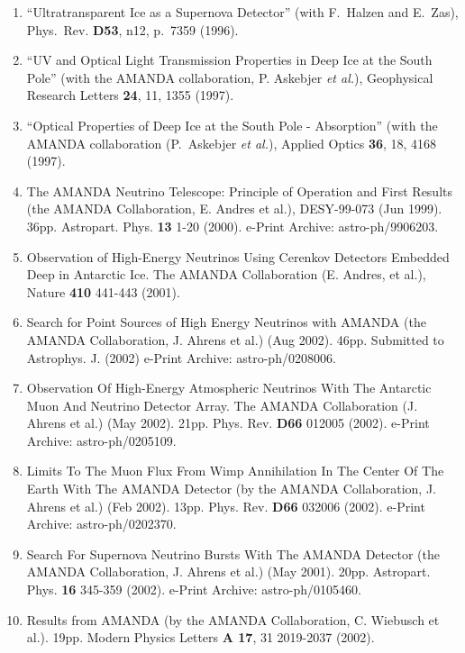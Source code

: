 \begin{enumerate}
\item ``Ultratransparent Ice as a Supernova Detector'' (with F.~Halzen
  and E.~Zas), Phys.~Rev. {\bf D53}, n12, p.~7359 (1996).

\item ``UV and Optical Light Transmission Properties in Deep Ice at
  the South Pole'' (with the AMANDA collaboration, P. Askebjer {\sl et
    al.}), Geophysical Research Letters {\bf 24}, 11, 1355 (1997).

\item ``Optical Properties of Deep Ice at the South Pole -
  Absorption'' (with the AMANDA collaboration (P.~Askebjer {\sl et
    al.}), Applied Optics {\bf 36}, 18, 4168 (1997).

\item The AMANDA Neutrino Telescope: Principle of Operation and First
  Results (the AMANDA Collaboration, E. Andres et al.), DESY-99-073
  (Jun 1999). 36pp. Astropart. Phys. {\bf 13} 1-20 (2000).  e-Print
  Archive: astro-ph/9906203.

\item Observation of High-Energy Neutrinos Using Cerenkov Detectors
  Embedded Deep in Antarctic Ice.  The AMANDA Collaboration
  (E. Andres, et al.), Nature {\bf 410} 441-443 (2001).

\item Search for Point Sources of High Energy Neutrinos with AMANDA
  (the AMANDA Collaboration, J. Ahrens et al.) (Aug
  2002). 46pp. Submitted to Astrophys. J. (2002) e-Print Archive:
  astro-ph/0208006.

\item Observation Of High-Energy Atmospheric Neutrinos With The
  Antarctic Muon And Neutrino Detector Array.  The AMANDA
  Collaboration (J. Ahrens et al.) (May 2002). 21pp. Phys. Rev. {\bf
    D66} 012005 (2002).  e-Print Archive: astro-ph/0205109.

\item Limits To The Muon Flux From Wimp Annihilation In The Center Of
  The Earth With The AMANDA Detector (by the AMANDA Collaboration,
  J. Ahrens et al.) (Feb 2002). 13pp. Phys. Rev. {\bf D66} 032006
  (2002). e-Print Archive: astro-ph/0202370.

\item Search For Supernova Neutrino Bursts With The AMANDA Detector
  (the AMANDA Collaboration, J. Ahrens et al.) (May 2001). 20pp.
  Astropart. Phys. {\bf 16} 345-359 (2002).  e-Print Archive:
  astro-ph/0105460.

\item Results from AMANDA (by the AMANDA Collaboration, C. Wiebusch et
  al.).  19pp.  Modern Physics Letters {\bf A 17}, 31 2019-2037
  (2002).


\end{enumerate}
